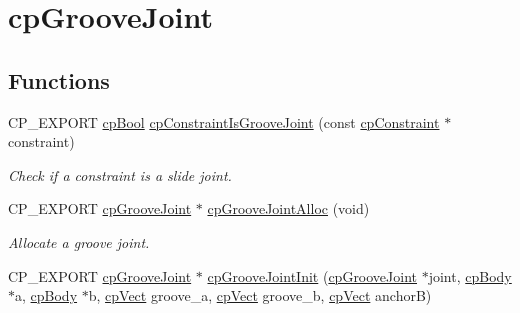 \hypertarget{group__cp_groove_joint}{}\section{cp\+Groove\+Joint}
\label{group__cp_groove_joint}
\subsection*{Functions}
\begin{DoxyCompactItemize}
\item 
\mbox{\label{group__cp_groove_joint_ga0b3250fa615962f7d9f532dda991af44}} 
C\+P\+\_\+\+E\+X\+P\+O\+RT \mbox{\hyperlink{group__basic_types_gabc5e752c48f3449ca26ef413ecbd647e}{cp\+Bool}} \mbox{\hyperlink{group__cp_groove_joint_ga0b3250fa615962f7d9f532dda991af44}{cp\+Constraint\+Is\+Groove\+Joint}} (const \mbox{\hyperlink{structcp_constraint}{cp\+Constraint}} $\ast$constraint)
\begin{DoxyCompactList}\small\item\em Check if a constraint is a slide joint. \end{DoxyCompactList}\item 
\mbox{\label{group__cp_groove_joint_ga03503ed2b6542088d0ed710e8f80f91b}} 
C\+P\+\_\+\+E\+X\+P\+O\+RT \mbox{\hyperlink{structcp_groove_joint}{cp\+Groove\+Joint}} $\ast$ \mbox{\hyperlink{group__cp_groove_joint_ga03503ed2b6542088d0ed710e8f80f91b}{cp\+Groove\+Joint\+Alloc}} (void)
\begin{DoxyCompactList}\small\item\em Allocate a groove joint. \end{DoxyCompactList}\item 
\mbox{\label{group__cp_groove_joint_ga053bccf2fb8203df3ce37b57ea69fd95}} 
C\+P\+\_\+\+E\+X\+P\+O\+RT \mbox{\hyperlink{structcp_groove_joint}{cp\+Groove\+Joint}} $\ast$ \mbox{\hyperlink{group__cp_groove_joint_ga053bccf2fb8203df3ce37b57ea69fd95}{cp\+Groove\+Joint\+Init}} (\mbox{\hyperlink{structcp_groove_joint}{cp\+Groove\+Joint}} $\ast$joint, \mbox{\hyperlink{structcp_body}{cp\+Body}} $\ast$a, \mbox{\hyperlink{structcp_body}{cp\+Body}} $\ast$b, \mbox{\hyperlink{structcp_vect}{cp\+Vect}} groove\+\_\+a, \mbox{\hyperlink{structcp_vect}{cp\+Vect}} groove\+\_\+b, \mbox{\hyperlink{structcp_vect}{cp\+Vect}} anchorB)

\end{DoxyCompactItemize}
